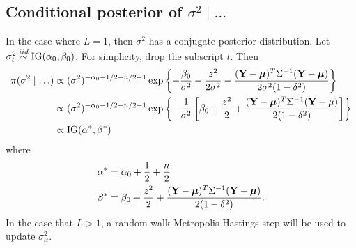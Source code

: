 \subsection*{Conditional posterior of $\sigma^2 \mid \ldots$}\label{s:sigpost}
In the case where $L = 1$, then $\sigma^2$ has a conjugate posterior distribution. 
Let $\sigma_t^2 \stackrel{iid}{\sim} \mbox{IG}(\alpha_0, \beta_0)$. For simplicity, drop the subscript $t$. Then
\begin{align*}
    \pi(\sigma^2 \mid \ldots) & \propto (\sigma^2)^{ -\alpha_0 - 1 / 2 - n / 2 - 1} \exp \left\{ -\frac{\beta_0}{\sigma^2} - \frac{ z^2 }{2 \sigma^2} - \frac{ (\mbox{\bf Y} - \mbox{\boldmath $\mu$})^T \Sigma^{-1} (\mbox{\bf Y} - \mbox{\boldmath $\mu$}) }{2 \sigma^2 (1 - \delta^2)} \right\} \\
    & \propto (\sigma^2)^{ -\alpha_0 - 1 / 2 - n / 2 - 1} \exp \left\{ - \frac{ 1 }{ \sigma^2 } \left[\beta_0 + \frac{ z^2 }{ 2 } + \frac{ (\mbox{\bf Y} - \mbox{\boldmath $\mu$})^T \Sigma^{-1} (\mbox{\bf Y} - \mu) }{ 2 (1 - \delta^2)} \right] \right\} \\
    & \propto \mbox{IG} (\alpha^*, \beta^*)
\end{align*}
where
\begin{align*}
    \alpha^* &= \alpha_0 + \frac{1}{2} + \frac{n}{2} \\
    \beta^* &= \beta_0 + \frac{ z^2 }{ 2 } + \frac{ (\mbox{\bf Y} - \mbox{\boldmath $\mu$})^T \Sigma^{-1} (\mbox{\bf Y} - \mbox{\boldmath $\mu$}) }{ 2 (1 - \delta^2)}.
\end{align*}
In the case that $L > 1$, a random walk Metropolis Hastings step will be used to update $\sigma^2_{lt}$.